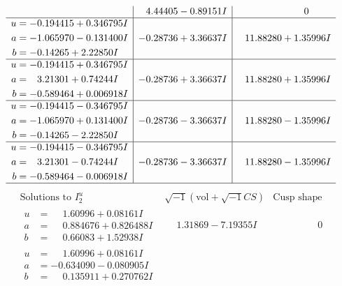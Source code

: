 \documentclass[1p]{elsarticle_modified}
\theoremstyle{definition}
\newcommand{\I}{\sqrt{-1}}
\begin{document}
$$\begin{array}{c|c|c}
 & \phantom{-}4.44405 - 0.89151 I & \phantom{-0.000000 } 0 \\ \hline\begin{aligned}
u &= -0.194415 + 0.346795 I \\
a &= -1.065970 - 0.131400 I \\
b &= -0.14265 + 2.22850 I\end{aligned}
 & -0.28736 + 3.36637 I & \phantom{-}11.88280 + 1.35996 I \\ \hline\begin{aligned}
u &= -0.194415 + 0.346795 I \\
a &= \phantom{-}3.21301 + 0.74244 I \\
b &= -0.589464 + 0.006918 I\end{aligned}
 & -0.28736 + 3.36637 I & \phantom{-}11.88280 + 1.35996 I \\ \hline\begin{aligned}
u &= -0.194415 - 0.346795 I \\
a &= -1.065970 + 0.131400 I \\
b &= -0.14265 - 2.22850 I\end{aligned}
 & -0.28736 - 3.36637 I & \phantom{-}11.88280 - 1.35996 I \\ \hline\begin{aligned}
u &= -0.194415 - 0.346795 I \\
a &= \phantom{-}3.21301 - 0.74244 I \\
b &= -0.589464 - 0.006918 I\end{aligned}
 & -0.28736 - 3.36637 I & \phantom{-}11.88280 - 1.35996 I\\
 \hline 
 \end{array}$$\newpage$$\begin{array}{c|c|c}  
\text{Solutions to }I^u_{2}& \I (\text{vol} + \sqrt{-1}CS) & \text{Cusp shape}\\
 \hline 
\begin{aligned}
u &= \phantom{-}1.60996 + 0.08161 I \\
a &= \phantom{-}0.884676 + 0.826488 I \\
b &= \phantom{-}0.66083 + 1.52938 I\end{aligned}
 & \phantom{-}1.31869 - 7.19355 I & \phantom{-0.000000 } 0 \\ \hline\begin{aligned}
u &= \phantom{-}1.60996 + 0.08161 I \\
a &= -0.634090 - 0.080905 I \\
b &= \phantom{-}0.135911 + 0.270762 I\end{aligned}

\end{array}$$
\end{document}
